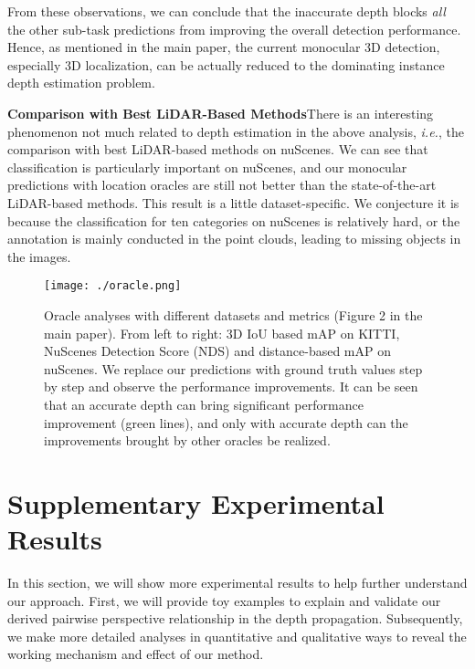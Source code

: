 From these observations, we can conclude that the inaccurate depth blocks \emph{all} the other sub-task predictions from improving the overall detection performance. Hence, as mentioned in the main paper, the current monocular 3D detection, especially 3D localization, can be actually reduced to the dominating instance depth estimation problem.

\noindent\textbf{Comparison with Best LiDAR-Based Methods}\quad There is an interesting phenomenon not much related to depth estimation in the above analysis, \emph{i.e.}, the comparison with best LiDAR-based methods on nuScenes. We can see that classification is particularly important on nuScenes, and our monocular predictions with location oracles are still not better than the state-of-the-art LiDAR-based methods. This result is a little dataset-specific. We conjecture it is because the classification for ten categories on nuScenes is relatively hard, or the annotation is mainly conducted in the point clouds, leading to missing objects in the images.
\begin{figure}
\begin{center}
\texttt{[image: ./oracle.png]}
\end{center}
   \vspace{-2ex}
   \caption{Oracle analyses with different datasets and metrics (Figure 2 in the main paper). From left to right: 3D IoU based mAP on KITTI, NuScenes Detection Score (NDS) and distance-based mAP on nuScenes. We replace our predictions with ground truth values step by step and observe the performance improvements. It can be seen that an accurate depth can bring significant performance improvement (green lines), and only with accurate depth can the improvements brought by other oracles be realized.}
\label{fig: apdx_oracle}
\vspace{-2ex}
\end{figure}

\section{Supplementary Experimental Results}
In this section, we will show more experimental results to help further understand our approach. First, we will provide toy examples to explain and validate our derived pairwise perspective relationship in the depth propagation. Subsequently, we make more detailed analyses in quantitative and qualitative ways to reveal the working mechanism and effect of our method.

